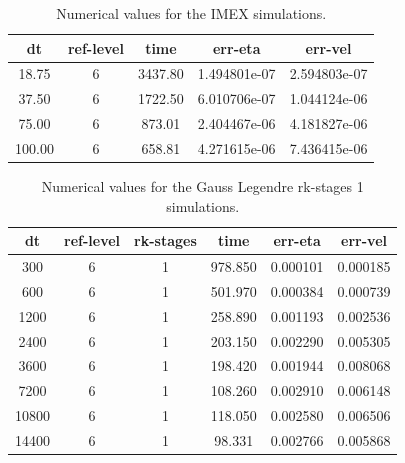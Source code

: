 \documentclass[a4paper, 12pt]{article}
\begin{document}
\begin{table}[h]\centering
\begin{tabular}{c|c|c|c|c}
dt    & ref-level &  time    & err-eta      &    err-vel \\ \hline
18.75 & 6         &  3437.80 & 1.494801e-07 &  2.594803e-07 \\
37.50     &     6  &  1722.50 & 6.010706e-07  &1.044124e-06 \\
75.00   &       6  &   873.01 & 2.404467e-06 & 4.181827e-06 \\
100.00     &     6  &   658.81 & 4.271615e-06 & 7.436415e-06
\end{tabular}
\caption{Numerical values for the IMEX simulations.}
\end{table}




\begin{table}[h]\centering
\begin{tabular}{c|c|c|c|c|c}
dt    & ref-level & rk-stages & time  &    err-eta      &    err-vel \\ \hline
300    &       6  &  1    &978.850  &  0.000101 &  0.000185 \\
600    &       6  & 1    &501.970  & 0.000384 &  0.000739\\
1200   &        6 &  1    &258.890 &  0.001193 &  0.002536\\
2400    &       6 &  1    &203.150 &  0.002290 &  0.005305\\
3600   &        6 &  1    &198.420 &  0.001944 &  0.008068\\
7200    &       6  & 1    &108.260 &  0.002910 &  0.006148\\
10800    &       6 & 1    & 118.050 &  0.002580 &  0.006506\\
14400    &       6  & 1    & 98.331 &  0.002766 &  0.005868\\
\end{tabular}
\caption{Numerical values for the Gauss Legendre rk-stages 1 simulations.}
\end{table}
\end{document}
